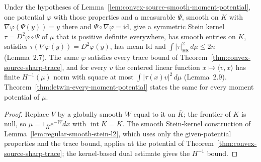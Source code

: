 \begin{lemma}
  \label{lem:convex-source-smooth-stein-kernel}
  \leanok
  Under the hypotheses of Lemma~\ref{lem:convex-source-smooth-moment-potential}, one potential $\varphi$
  with those properties and a measurable $\Psi$, smooth on $K$ with $\nabla\varphi(\Psi(y))=y$ there and
  $\Psi\circ\nabla\varphi=\mathrm{id}$, give a symmetric Stein kernel $\tau=D^2\varphi\circ\Psi$ of $\mu$
  that is positive definite everywhere, has smooth entries on $K$, satisfies
  $\tau(\nabla\varphi(y))=D^2\varphi(y)$, has mean $\mathrm{Id}$ and $\int|\tau|_{\mathrm{HS}}^2\,d\mu\le2n$
  (Lemma~2.7). The same $\varphi$ satisfies every trace bound of
  Theorem~\ref{thm:convex-source-sharp-trace}, and for every $v$ the centered linear function
  $x\mapsto\langle v,x\rangle$ has finite $H^{-1}(\mu)$ norm with square at most
  $\int|\tau(x)v|^2\,d\mu$ (Lemma~2.9). Theorem~\ref{thm:letwin-every-moment-potential} states the same for
  every moment potential of $\mu$.
\end{lemma}
\begin{proof}
  \leanok
  Replace $V$ by a globally smooth $W$ equal to it on $\overline K$; the frontier of $K$ is null, so
  $\mu=1_{\overline K}e^{-W}dx$ with $\operatorname{int}\overline K=K$. The smooth Stein-kernel construction
  of Lemma~\ref{lem:regular-smooth-stein-l2}, which uses only the given-potential properties and the
  trace bound, applies at the potential of Theorem~\ref{thm:convex-source-sharp-trace}; the kernel-based
  dual estimate gives the $H^{-1}$ bound.
\end{proof}

